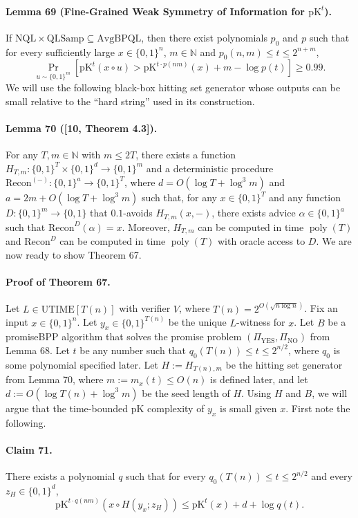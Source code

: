 \paragraph{Lemma 69 (Fine-Grained Weak Symmetry of Information for $\mathrm{pK}^t$).} If $\mathrm{NQL}\times\mathrm{QLSamp}\subseteq\mathrm{AvgBPQL}$, then there exist polynomials $p_0$ and $p$ such that for every sufficiently large $x\in\{0,1\}^n$, $m\in\mathbb N$ and $p_0(n,m)\leq t\leq2^{n+m}$,
\[\Pr_{u\sim\{0,1\}^m}[\mathrm{pK}^t(x\circ u)>\mathrm{pK}^{t\cdot p(nm)}(x)+m-\log p(t)]\geq0.99.\]
We will use the following black-box hitting set generator whose outputs can be small relative to the ``hard string'' used in its construction.
\paragraph{Lemma 70 ([10, Theorem 4.3]).} For any $T,m\in\mathbb N$ with $m\leq2T$, there exists a function $H_{T,m}:\{0,1\}^T\times\{0,1\}^d\to\{0,1\}^m$ and a deterministic procedure $\mathrm{Recon}^{(-)}:\{0,1\}^a\to\{0,1\}^T$, where $d=O(\log T+\log^3m)$ and $a=2m+O(\log T+\log^3m)$ such that, for any $x\in\{0,1\}^T$ and any function $D:\{0,1\}^m\to\{0,1\}$ that $0.1$-avoids $H_{T,m}(x,-)$, there exists advice $\alpha\in\{0,1\}^a$ such that $\mathrm{Recon}^D(\alpha)=x$. Moreover, $H_{T,m}$ can be computed in time $\operatorname{poly}(T)$ and $\mathrm{Recon}^D$ can be computed in time $\operatorname{poly}(T)$ with oracle access to $D$.
We are now ready to show Theorem 67.
\paragraph{Proof of Theorem 67.} Let $L\in\mathrm{UTIME}[T(n)]$ with verifier $V$, where $T(n)=2^{O(\sqrt{n\log n})}$. Fix an input $x\in\{0,1\}^n$. Let $y_x\in\{0,1\}^{T(n)}$ be the unique $L$-witness for $x$. Let $B$ be a promiseBPP algorithm that solves the promise problem $(\Pi_{\mathrm{YES}},\Pi_{\mathrm{NO}})$ from Lemma 68.
Let $t$ be any number such that $q_0(T(n))\leq t\leq2^{n/2}$, where $q_0$ is some polynomial specified later. Let $H:=H_{T(n),m}$ be the hitting set generator from Lemma 70, where $m:=m_x(t)\leq O(n)$ is defined later, and let $d:=O(\log T(n)+\log^3m)$ be the seed length of $H$.
Using $H$ and $B$, we will argue that the time-bounded pK complexity of $y_x$ is small given $x$. First note the following.
\paragraph{Claim 71.} There exists a polynomial $q$ such that for every $q_0(T(n))\leq t\leq2^{n/2}$ and every $z_H\in\{0,1\}^d$,
\[\mathrm{pK}^{t\cdot q(nm)}(x\circ H(y_x;z_H))\leq\mathrm{pK}^t(x)+d+\log q(t).\]
